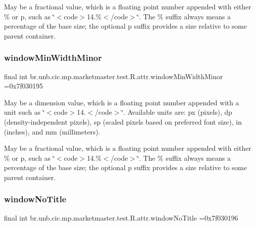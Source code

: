 May be a fractional value, which is a floating point number appended with either \% or p, such as \char`\"{}$<$code$>$14.\%$<$/code$>$\char`\"{}. The \% suffix always means a percentage of the base size; the optional p suffix provides a size relative to some parent container. \mbox{\label{classbr_1_1unb_1_1cic_1_1mp_1_1marketmaster_1_1test_1_1R_1_1attr_aa28a27ed51900b367fdf212626b68df8}} 
\subsubsection{\texorpdfstring{window\+Min\+Width\+Minor}{windowMinWidthMinor}}
{\footnotesize\ttfamily final int br.\+unb.\+cic.\+mp.\+marketmaster.\+test.\+R.\+attr.\+window\+Min\+Width\+Minor =0x7f030195\hspace{0.3cm}{\ttfamily [static]}}

May be a dimension value, which is a floating point number appended with a unit such as \char`\"{}$<$code$>$14.\+5sp$<$/code$>$\char`\"{}. Available units are\+: px (pixels), dp (density-\/independent pixels), sp (scaled pixels based on preferred font size), in (inches), and mm (millimeters). 

May be a fractional value, which is a floating point number appended with either \% or p, such as \char`\"{}$<$code$>$14.\%$<$/code$>$\char`\"{}. The \% suffix always means a percentage of the base size; the optional p suffix provides a size relative to some parent container. \mbox{\label{classbr_1_1unb_1_1cic_1_1mp_1_1marketmaster_1_1test_1_1R_1_1attr_aa7c3980e07d6a45a3888c701a898f9b0}} 
\subsubsection{\texorpdfstring{window\+No\+Title}{windowNoTitle}}
{\footnotesize\ttfamily final int br.\+unb.\+cic.\+mp.\+marketmaster.\+test.\+R.\+attr.\+window\+No\+Title =0x7f030196\hspace{0.3cm}{\ttfamily [static]}}

